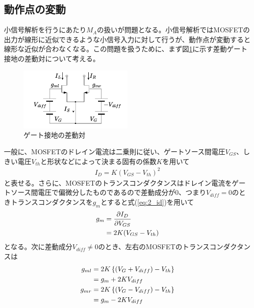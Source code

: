         \subsection{動作点の変動}   \label{ch:gilbert_valiable_gm}
            小信号解析を行うにあたり$M_{A}$の扱いが問題となる。小信号解析ではMOSFETの出力が線形に近似できるような小信号入力に対して行うが、動作点が変動すると線形な近似が合わなくなる。この問題を扱うために、まず図\ref{fig:2_OP}に示す差動ゲート接地の差動対について考える。\par
            \begin{figure}[b]
                \begin{center}
                    \includegraphics[width=0.5\textwidth]{figures/chapter2/OperatingPoint.pdf}
                    \caption{ゲート接地の差動対}
                    \label{fig:2_OP}
                \end{center}
            \end{figure}
            一般に、MOSFETのドレイン電流は二乗則に従い、ゲートソース間電圧$V_{GS}$、しきい電圧$V_{th}$と形状などによって決まる固有の係数$K$を用いて
            \begin{align}
                I_{D}=K(V_{GS}-V_{th})^{2}  \label{eq:2_id}
            \end{align}
            と表せる。さらに、MOSFETのトランスコンダクタンスはドレイン電流をゲートソース間電圧で偏微分したものであるので差動成分が$0$、つまり$V_{diff}=0$のときトランスコンダクタンスを$g_{m}$とすると式(\ref{eq:2_id})を用いて
            \begin{align}
                g_{m}&=\frac{ \partial I_{D} }{ \partial V_{GS} }   \notag\\
                &=2K(V_{GS}-V_{th})     \label{eq:2_gm}
            \end{align}
            となる。次に差動成分$V_{diff}\neq0$のとき、左右のMOSFETのトランスコンダクタンスは
            \begin{align}
                g_{ml}&=2K\left\{ (V_{G}+V_{diff}) -V_{th} \right\}     \notag\\
                &=g_{m}+2KV_{diff}      \notag\\
                g_{mr}&=2K\left\{ (V_{G}-V_{diff}) -V_{th} \right\}     \notag\\
                &=g_{m}-2KV_{diff}      \notag
            \end{align}
